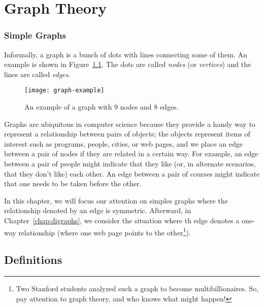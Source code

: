 \chapter{Graph Theory}\label{chap:graph_theory}

\subsection{Simple Graphs}

Informally, a graph is a bunch of dots with lines connecting some of
them.  An example is shown in Figure~\ref{fig:graph-example}.  The
dots are called \emph{nodes} (or \emph{vertices}) and the lines are
called \emph{edges}.

\begin{figure}[h]
\texttt{[image: graph-example]}
\caption{An example of a graph with 9 nodes and 8 edges.}
\label{fig:graph-example}
\end{figure}

Graphs are ubiquitous in computer science because they provide a handy
way to represent a relationship between pairs of objects;  the objects
represent items of interest such as programs, people, cities, or web
pages, and we place an edge between a pair of nodes if they are
related in a certain way.  For example, an edge between a pair of
people might indicate that they like (or, in alternate scenarios, that
they don't like) each other.  An edge between a pair of courses might
indicate that one needs to be taken before the other.

In this chapter, we will focus our attention on simples graphs where
the relationship denoted by an edge is symmetric.  Afterward, in
Chapter~\ref{chap:digraphs}, we consider the situation where th edge
denotes a one-way relationship (\eg where one web page points to the
other\footnote{Two Stanford students analyzed such a graph to become
  multibillionaires.  So, pay attention to graph theory, and who knows
  what might happen!}).


\section{Definitions}\label{degreessec}

